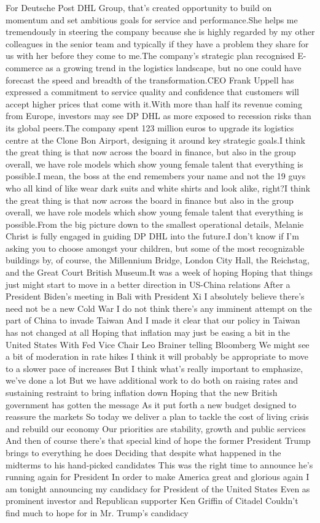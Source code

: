 \documentclass{article}%
\begin{document}
For Deutsche Post DHL Group, that's created opportunity to build on momentum and set ambitious goals for service and performance.She helps me tremendously in steering the company because she is highly regarded by my other colleagues in the senior team and typically if they have a problem they share for us with her before they come to me.The company's strategic plan recognised E{-}commerce as a growing trend in the logistics landscape, but no one could have forecast the speed and breadth of the transformation.CEO Frank Uppell has expressed a commitment to service quality and confidence that customers will accept higher prices that come with it.With more than half its revenue coming from Europe, investors may see DP DHL as more exposed to recession risks than its global peers.The company spent 123 million euros to upgrade its logistics centre at the Clone Bon Airport, designing it around key strategic goals.I think the great thing is that now across the board in finance, but also in the group overall, we have role models which show young female talent that everything is possible.I mean, the boss at the end remembers your name and not the 19 guys who all kind of like wear dark suits and white shirts and look alike, right?I think the great thing is that now across the board in finance but also in the group overall, we have role models which show young female talent that everything is possible.From the big picture down to the smallest operational details, Melanie Christ is fully engaged in guiding DP DHL into the future.I don't know if I'm asking you to choose amongst your children, but some of the most recognizable buildings by, of course, the Millennium Bridge, London City Hall, the Reichstag, and the Great Court British Museum.It was a week of hoping Hoping that things just might start to move in a better direction in US{-}China relations After a President Biden's meeting in Bali with President Xi I absolutely believe there's need not be a new Cold War I do not think there's any imminent attempt on the part of China to invade Taiwan And I made it clear that our policy in Taiwan has not changed at all Hoping that inflation may just be easing a bit in the United States With Fed Vice Chair Leo Brainer telling Bloomberg We might see a bit of moderation in rate hikes I think it will probably be appropriate to move to a slower pace of increases But I think what's really important to emphasize, we've done a lot But we have additional work to do both on raising rates and sustaining restraint to bring inflation down Hoping that the new British government has gotten the message As it put forth a new budget designed to reassure the markets So today we deliver a plan to tackle the cost of living crisis and rebuild our economy Our priorities are stability, growth and public services And then of course there's that special kind of hope the former President Trump brings to everything he does Deciding that despite what happened in the midterms to his hand{-}picked candidates This was the right time to announce he's running again for President In order to make America great and glorious again I am tonight announcing my candidacy for President of the United States Even as prominent investor and Republican supporter Ken Griffin of Citadel Couldn't find much to hope for in Mr. Trump's candidacy 
\end{document}

